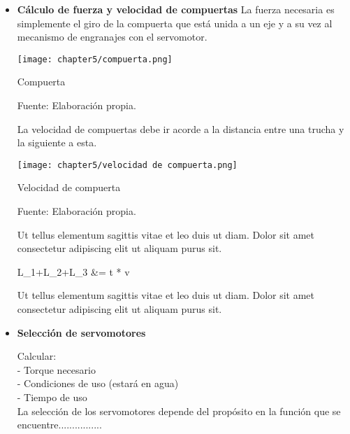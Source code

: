 \begin{itemize}
	
	\item \textbf{Cálculo de fuerza y velocidad de compuertas}
	La fuerza necesaria es simplemente el giro de la compuerta que está unida a un eje y a su vez al mecanismo de engranajes con el servomotor.
	
	\begin{myfigure}[H]
		\centering
		\texttt{[image: chapter5/compuerta.png]}
		\caption{Compuerta}
		\begin{myflushleftportland}
			Fuente: Elaboración propia.
		\end{myflushleftportland}
		\label{fig:compuerta}
	\end{myfigure}
	
	La velocidad de compuertas debe ir acorde a la distancia entre una trucha y la siguiente a esta. 
	
	\begin{myfigure}[H]
		\centering
		\texttt{[image: chapter5/velocidad de compuerta.png]}
		\caption{Velocidad de compuerta}
		\begin{myflushleftportland}
			Fuente: Elaboración propia.
		\end{myflushleftportland}
		\label{fig:velocidad de compuerta}
	\end{myfigure}

	Ut tellus elementum sagittis vitae et leo duis ut diam. Dolor sit amet consectetur adipiscing elit ut aliquam purus sit. 
	
	\begin{myequation}\label{eq:calculo de tiempo necesario}
		\begin{split}
			L_1+L_2+L_3 &= t * v
		\end{split}		
	\end{myequation}

	Ut tellus elementum sagittis vitae et leo duis ut diam. Dolor sit amet consectetur adipiscing elit ut aliquam purus sit. 

	
	\item \textbf{Selección de servomotores}
		
	Calcular: \\
	- Torque necesario \\
	- Condiciones de uso (estará en agua) \\
	- Tiempo de uso \\
	
	La selección de los servomotores depende del propósito en la función que se encuentre................
	

\end{itemize}
